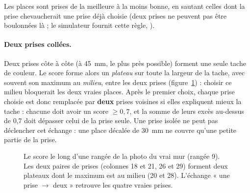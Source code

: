 \documentclass[11pt,a4paper]{article}
\newcommand{\code}[1]{\texttt{\detokenize{#1}}}
\begin{document}
Les places sont prises de la meilleure à la moins bonne, en sautant celles dont la prise chevaucherait une prise déjà
choisie (deux prises ne peuvent pas être boulonnées là ; le simulateur fournit cette règle, \code{OVERLAP}).

\paragraph{Deux prises collées.} Deux prises côte à côte (à 45~mm, le plus près possible) forment une seule tache de
couleur. Le score forme alors un \emph{plateau} sur toute la largeur de la tache, avec souvent son maximum au
\emph{milieu}, entre les deux prises (figure~\ref{fig:plateau}) : choisir ce milieu bloquerait les deux vraies
places. Après le premier choix, chaque prise choisie est donc remplacée par \textbf{deux} prises voisines si elles
expliquent mieux la tache : chacune doit avoir un score $\geq 0{,}7$, et la somme de leurs excès au-dessus de 0,7
doit dépasser celui de la prise seule. Une prise isolée ne peut pas déclencher cet échange : une place décalée de
30~mm ne couvre qu'une petite partie de la prise.

\begin{figure}[H]
\centering
{}
\caption{Le score le long d'une rangée de la photo du vrai mur (rangée 9). Les deux paires de prises (colonnes 18 et
21, 26 et 29) forment deux plateaux dont le maximum est au milieu (20 et 28). L'échange « une prise $\to$ deux »
retrouve les quatre vraies prises.}
\label{fig:plateau}
\end{figure}
\end{document}
